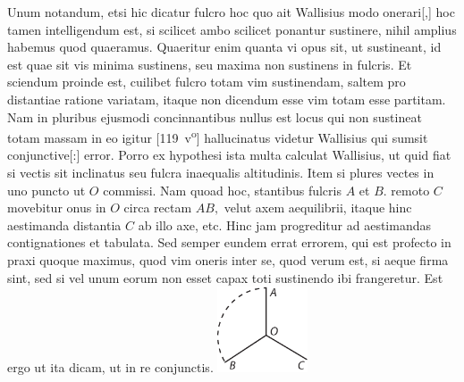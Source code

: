 Unum notandum, etsi hic dicatur fulcro hoc
quo ait Wallisius\protect{} modo onerari[,]
hoc tamen intelligendum est, si scilicet ambo
scilicet ponantur sustinere,
nihil amplius habemus quod quaeramus.
Quaeritur enim quanta vi opus sit, ut sustineant,
id est quae sit vis minima sustinens,\protect{}
seu maxima non sustinens in fulcris.
Et sciendum proinde est,
cuilibet fulcro\protect{} totam vim sustinendam, saltem pro distantiae ratione variatam,
itaque non dicendum esse vim totam esse partitam.
Nam in pluribus ejusmodi concinnantibus nullus est locus
qui non sustineat totam massam\protect{}
in eo igitur
%
[119~v\textsuperscript{o}] %
%
hallucinatus videtur Wallisius\protect{}
qui sumsit conjunctive[:]
error. Porro ex hypothesi ista multa calculat
Wallisius,\protect{}
ut quid fiat si vectis\protect{} sit inclinatus
seu fulcra\protect{} inaequalis altitudinis.
Item si plures vectes in uno puncto ut $\displaystyle O$ commissi.
Nam quoad hoc,
stantibus fulcris $\displaystyle A$ et $\displaystyle B.$
remoto $\displaystyle C$
movebitur onus\protect{} in $\displaystyle O$
circa rectam $\displaystyle AB,$ velut axem aequilibrii,
itaque hinc aestimanda distantia $\displaystyle C$ ab illo axe, etc.
Hinc jam progreditur ad aestimandas contignationes\protect{}
et tabulata\protect{}.
Sed semper eundem errat errorem,
qui est profecto in praxi quoque maximus,
quod 
vim oneris\protect{} inter se,
quod verum est, si aeque firma sint,
sed si vel unum eorum non esset capax toti sustinendo ibi frangeretur.
Est ergo ut ita dicam, ut in re conjunctis.
\pend
\vspace{0.9em}
\count{}
\count{}
\pstart
\centering \includegraphics[width=0.2\textwidth]{images/LH035,14,02_119v-d1.pdf}\\
